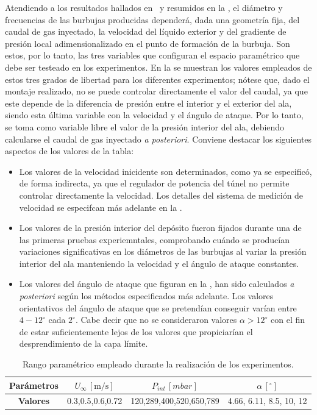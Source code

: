 Atendiendo a los resultados hallados en~\cite{Evangelio2015} y resumidos en la , el diámetro y frecuencias de las burbujas producidas dependerá, dada una geometría fija, del caudal de gas inyectado, la velocidad del líquido exterior y  del gradiente de presión local adimensionalizado en el punto de formación de la burbuja. Son estos, por lo tanto, las tres variables que configuran el espacio paramétrico que debe ser testeado en los experimentos.  En la  se muestran los valores empleados de estos tres grados de libertad para los diferentes experimentos; nótese que, dado el montaje realizado, no se puede controlar directamente el valor del caudal, ya que este depende de la diferencia de presión entre el interior y el exterior del ala, siendo esta última variable con la velocidad y el ángulo de ataque. Por lo tanto, se toma como variable libre el valor de la presión interior del ala, debiendo calcularse el caudal de gas inyectado \textit{a posteriori}. Conviene destacar los siguientes aspectos de los valores de la tabla:

\begin{itemize}
\item Los valores de la velocidad inicidente son determinados, como ya se especificó, de forma indirecta, ya que el regulador de potencia del túnel no permite controlar directamente la velocidad. Los detalles del sistema de medición de velocidad se especifcan más adelante en la .
\item Los valores de la presión interior del depósito fueron fijados durante una de las primeras pruebas experiemntales, comprobando cuándo se producían variaciones significativas en los diámetros de las burbujas al variar la presión interior del ala manteniendo la velocidad y el ángulo de ataque constantes. 
\item Los valores del ángulo de ataque que figuran en la , han sido calculados \textit{a posteriori } según los métodos especificados más adelante. Los valores orientativos del ángulo de ataque que se pretendían conseguir varían entre $4-12^{\circ}$ cada $2^{\circ}$. Cabe decir que no se consideraron valores $\alpha > 12^{\circ}$ con el fin de estar suficientemente lejos de los valores que propiciarían el desprendimiento de la capa límite. 
\end{itemize}


\begin{table}
\centering
\begin{tabular}{c || c c c}
\textbf{Parámetros} & $U_{\infty}\,\left[\mathrm{m/s}\right]$ & $P_{int}\,\left[mbar\right]$ & $\alpha\,\left[^{\circ}\right]$  \\
\hline \hline
\textbf{Valores} & 0.3,0.5,0.6,0.72 & 120,289,400,520,650,789 & 4.66, 6.11, 8.5, 10, 12 \\
\hline
\end{tabular}
\caption{Rango paramétrico empleado durante la realización de los experimentos.}
\end{table}

